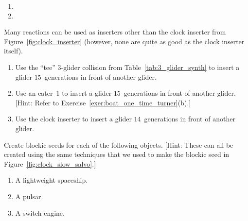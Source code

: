 \begin{multicols}{2}
\begin{problem}
\begin{multicols}{2}
\begin{enumerate}[label=(\alph*)]
			\item {}
			
			\item {}
		\end{enumerate}
	\end{multicols}
\end{problem}

\mfilbreak

\begin{problem}\label{exer:other_inserters}
	Many reactions can be used as inserters other than the clock inserter from Figure~\ref{fig:clock_inserter} (however, none are quite as good as the clock inserter itself).
	\begin{enumerate}[label=(\alph*)]
		\item Use the ``tee'' $3$-glider collision from Table~\ref{tab:3_glider_synth} to insert a glider $15$~generations in front of another glider.
		
		\item Use an eater~1 to insert a glider $15$~generations in front of another glider. [Hint: Refer to Exercise~\ref{exer:boat_one_time_turner}(b).]
		
		\item Use the clock inserter to insert a glider $14$~generations in front of another glider.
	\end{enumerate}
\end{problem}

\mfilbreak

\begin{problem}\label{exer:other_blockic}
	Create blockic seeds for each of the following objects. [Hint: These can all be created using the same techniques that we used to make the blockic seed in Figure~\ref{fig:clock_slow_salvo}.]
	\begin{enumerate}[label=(\alph*)]
		\item A lightweight spaceship.
		
		\item A pulsar.
		
		\item A switch engine.
	\end{enumerate}
\end{problem}

\mfilbreak


\end{multicols}
